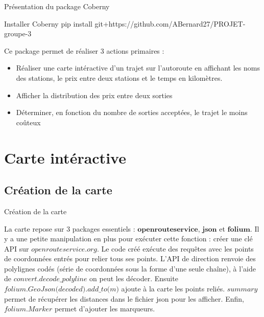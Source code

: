\documentclass{beamer}
\begin{document}
\begin{frame}[fragile]{Présentation du package Coberny}
\begin{block}{Installer Coberny}
pip install git+https://github.com/ABernard27/PROJET-groupe-3
\end{block}
Ce package permet de réaliser 3 actions primaires : \newline
\begin{itemize}
\item Réaliser une carte intéractive d'un trajet sur l'autoroute en affichant les noms des stations, le prix entre deux stations et le temps en kilomètres.
\item Afficher la distribution des prix entre deux sorties
\item Déterminer, en fonction du nombre de sorties acceptées, le trajet le moins coûteux
\end{itemize}
\end{frame}



\section{Carte intéractive}
\subsection{Création de la carte}

\begin{frame}[fragile]{Création de la carte}

La carte repose sur 3 packages essentiels : $\textbf{openrouteservice}$, $\textbf{json}$ et $\textbf{folium}$. Il y a une petite manipulation en plus pour exécuter cette fonction : créer une clé API sur $\textit{openrouteservice.org}$. Le code créé exécute des requêtes avec les points de coordonnées entrés pour relier tous ses points. L'API de direction renvoie des polylignes codés (série de coordonnées sous la forme d'une seule chaîne), à l'aide de 
$\textit{convert.decode\_polyline}$ on peut les décoder. Ensuite $\textit{folium.GeoJson(decoded).add\_to(m)}$ ajoute à la carte les points reliés. $\textit{summary}$ permet de récupérer les distances dans le fichier json pour les afficher. Enfin, $\textit{folium.Marker}$ permet d'ajouter les marqueurs.
\end{frame}
\end{document}
